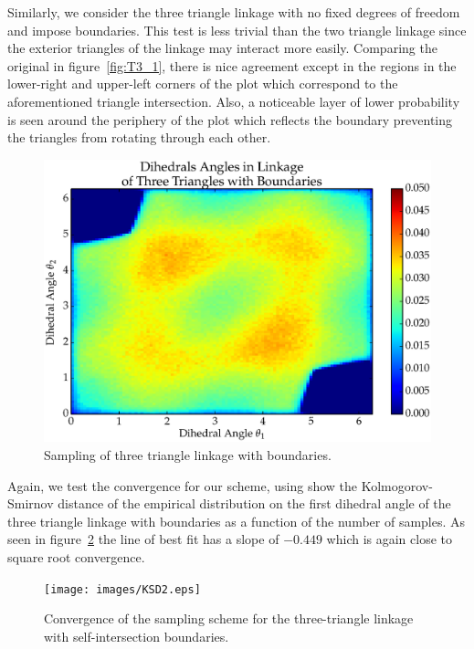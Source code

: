 Similarly, we consider the three triangle linkage with no fixed degrees of freedom and impose boundaries. This test is less trivial than the two triangle linkage since the exterior triangles of the linkage may interact more easily. Comparing the original in figure~\ref{fig:T3_1}, there is nice agreement except in the regions in the lower-right and upper-left corners of the plot which correspond to the aforementioned triangle intersection. Also, a noticeable layer of lower probability is seen around the periphery of the plot which reflects the boundary preventing the triangles from rotating through each other.
\begin{figure}[ht]
\centering
  \includegraphics[scale=0.6]{images/T3_2_2D.eps}
\caption{Sampling of three triangle linkage with boundaries.}
\label{fig:T3_2}
\end{figure}

Again, we test the convergence for our scheme, using show the Kolmogorov-Smirnov distance of the empirical distribution on the first dihedral angle of the three triangle linkage with boundaries as a function of the number of samples. As seen in figure~\ref{fig:KSD2} the line of best fit has a slope of $-0.449$ which is again close to square root convergence.
\begin{figure}[ht]
\centering
  \texttt{[image: images/KSD2.eps]}
\caption{Convergence of the sampling scheme for the three-triangle linkage with self-intersection boundaries.}
\label{fig:KSD2}
\end{figure}





